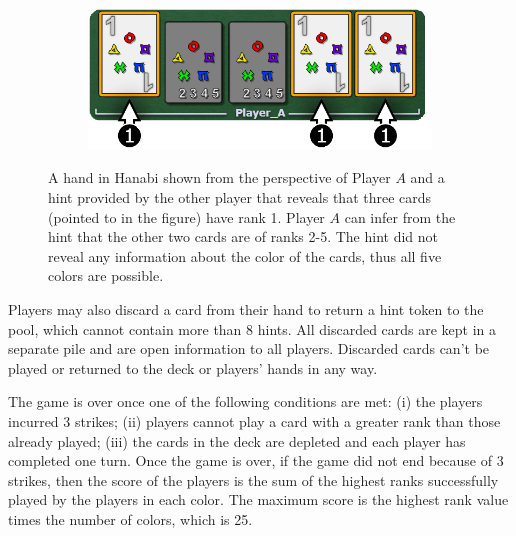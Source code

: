 \documentclass[letterpaper]{article} %
\begin{document}
\begin{figure}
     \centering
     \begin{subfigure}[b]{0.5\textwidth}
         \centering
         \includegraphics[width=\textwidth]{got hint.png}
     \end{subfigure}
     \caption{A hand in Hanabi shown from the perspective of Player $A$ and a hint provided by the other player that reveals  that three cards (pointed to in the figure) have rank 1. Player $A$ can infer from the hint that  the other two cards are of ranks 2-5. The hint did not reveal any information  about the color of the cards, thus all five colors are possible.}
     \hfill
     \label{hint example}
\end{figure}

Players may also discard a card from their hand to return a hint token to the pool, which cannot contain more than 8 hints. All discarded cards are kept in a separate pile and are open information to all players. Discarded cards can't be played or returned to the deck or players' hands in any way. 

The game is over once one of the following conditions are met: (i) the players incurred 3 strikes; (ii) players cannot play a card with a greater rank than those already played; (iii) the cards in the  deck are depleted and each player has completed one turn. 
Once the game is over, if the game did not end because of 3 strikes, then the score of the players is the sum of the highest ranks successfully played by the players in each color. The maximum score is the highest rank value times the  number of colors, which is 25. 
\end{document}
